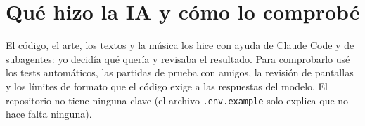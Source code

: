 \documentclass[11pt,a4paper]{article}
\begin{document}
\section{Qué hizo la IA y cómo lo comprobé}
El código, el arte, los textos y la música los hice con ayuda de Claude Code y de subagentes: yo decidía qué quería y revisaba el resultado. Para comprobarlo usé los tests automáticos, las partidas de prueba con amigos, la revisión de pantallas y los límites de formato que el código exige a las respuestas del modelo. El repositorio no tiene ninguna clave (el archivo \texttt{.env.example} solo explica que no hace falta ninguna).
\end{document}
